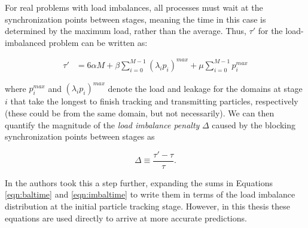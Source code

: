 \documentclass[12pt,twoside]{mitthesis-exec}
\begin{document}
For real problems with load imbalances, all processes must wait at the
synchronization points between stages, meaning the time in this case is 
determined by the maximum load, rather than the average.  Thus, $\tau'$
for the load-imbalanced problem can be written as:

\begin{equation}
    \begin{aligned}
    \tau' &= 6 \alpha M + 
      \beta \sum_{i=0}^{M-1} \left(\lambda_i p_i\right)^{max} +
      \mu \sum_{i=0}^{M-1} p_i^{max}
    \end{aligned}
    \label{eqn:imbaltime}
\end{equation}

\noindent where $p_i^{max}$ and $\left(\lambda_i p_i\right)^{max}$ denote the
load and leakage for the domains at stage $i$ that take the longest to finish
tracking and transmitting particles, respectively (these could be from the same
domain, but not necessarily). We can then quantify the magnitude of the
\emph{load imbalance penalty} $\Delta$ caused by the blocking synchronization
points between stages as

\begin{equation}
    \Delta \equiv \frac{\tau' - \tau}{\tau}.
    \label{eqn:penalty}
\end{equation}

In \cite{Siegel2} the authors took this a step further, expanding the sums in
Equations \ref{eqn:baltime} and \ref{eqn:imbaltime} to write them in terms of
the load imbalance distribution at the initial particle tracking stage. However,
in this thesis these equations are used directly to arrive at more accurate
predictions.



\begin{singlespace}


\end{singlespace}
\end{document}
